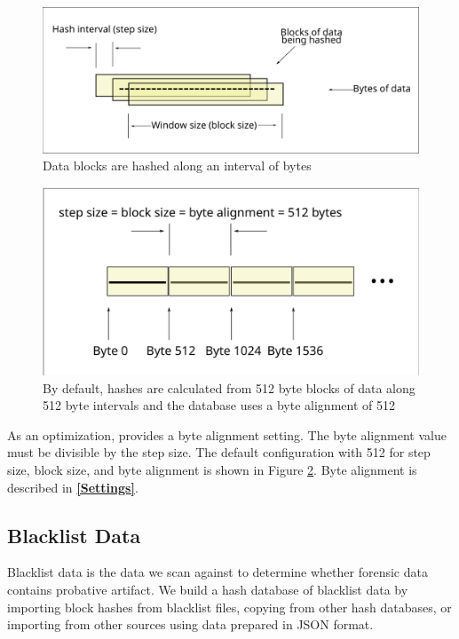 \documentclass[11pt,fleqn]{article} %
\begin{document}
\begin{figure}
	\center
	\includegraphics[scale=.45]{drawings/hash_interval}
	\caption{Data blocks are hashed along an interval of bytes}
	\label{fig:hashInterval}
\end{figure}

\begin{figure}
	\center
	\includegraphics[scale=.45]{drawings/default_hash_interval}
	\caption{By default, hashes are calculated from 512 byte blocks of data along 512 byte intervals and the database uses a byte alignment of 512}
	\label{fig:defaultHashInterval}
\end{figure}

As an optimization, \hdb provides a byte alignment setting. The byte alignment value must be divisible by the step size. The default configuration with 512 for step size, block size, and byte alignment is shown in Figure \ref{fig:defaultHashInterval}. Byte alignment is described in \textbf{\autoref{Settings}}.\\

\subsection{Blacklist Data}
Blacklist data is the data we scan against to determine whether forensic data
contains probative artifact.
We build a hash database of blacklist data by importing block hashes
from blacklist files, copying from other hash databases,
or importing from other sources using data prepared in JSON format.\\
\end{document}
